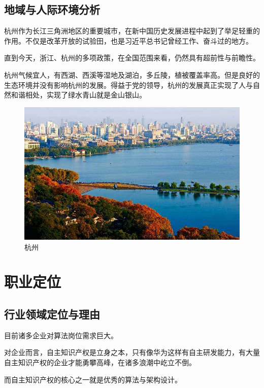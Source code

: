 \documentclass{article}
\begin{document}
\subsection{地域与人际环境分析}
杭州作为长江三角洲地区的重要城市，在新中国历史发展进程中起到了举足轻重的作用。不仅是改革开放的试验田，也是习近平总书记曾经工作、奋斗过的地方。\par
直到今天，浙江、杭州的多项政策，在全国范围来看，仍然具有超前性与前瞻性。\par
杭州气候宜人，有西湖、西溪等湿地及湖泊，多丘陵，植被覆盖率高。但是良好的生态环境并没有影响杭州的发展。得益于党的领导，杭州的发展真正实现了人与自然和谐相处，实现了绿水青山就是金山银山。

\begin{figure}[h!]
\centering
\includegraphics[scale=0.55]{timg}
\caption{杭州}
\label{fig:timg}
\end{figure}



\section{职业定位}
\subsection{行业领域定位与理由}
目前诸多企业对算法岗位需求巨大。\par
对企业而言，自主知识产权是立身之本，只有像华为这样有自主研发能力，有大量自主知识产权的企业才能勇攀高峰，在诸多浪潮中屹立不倒。\par
而自主知识产权的核心之一就是优秀的算法与架构设计。
\end{document}
